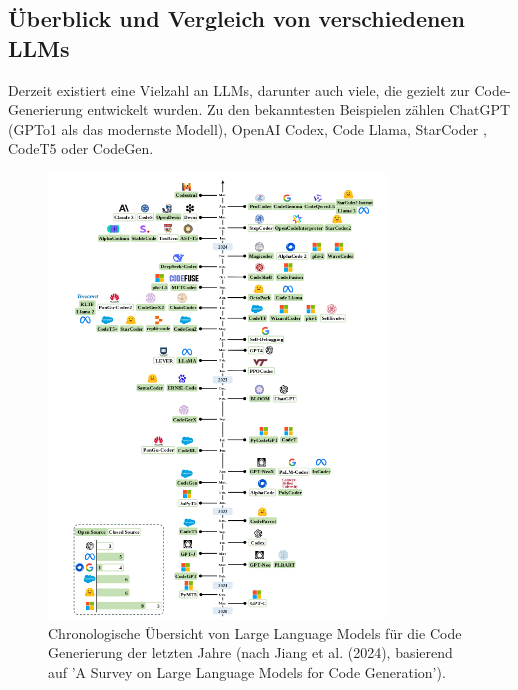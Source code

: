 \documentclass[11pt,a4paper]{article}
\begin{document}
\subsection{Überblick und Vergleich von verschiedenen LLMs}
Derzeit existiert eine Vielzahl an LLMs, darunter auch viele, die gezielt zur Code-Generierung entwickelt wurden. Zu den bekanntesten Beispielen zählen ChatGPT (GPTo1 als das modernste Modell), OpenAI Codex, Code Llama\cite{rozière2024codellamaopenfoundation}, StarCoder \cite{li2023starcodersourceyou}, CodeT5\cite{wang2021codet5identifierawareunifiedpretrained} oder CodeGen\cite{nijkamp2023codegenopenlargelanguage}.
\begin{figure}[H]
    \centering
    \includegraphics[width=0.8\textwidth]{./bilder/LLMs_for_coding.png}
    \caption{Chronologische Übersicht von Large Language Models für die Code Generierung der letzten Jahre (nach Jiang et al. (2024), basierend auf 'A Survey on Large Language Models for Code Generation').}
    \label{fig:llms_for_coding}
\end{figure}
\end{document}
